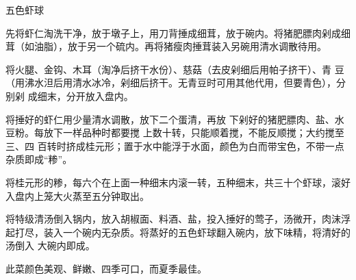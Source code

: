 \begin{recipe}{五色虾球}

\ingredients


\preparation

\step 先将虾仁淘洗干净，放于墩子上，用刀背捶成细茸，放于碗内。将猪肥膘肉剁成细
茸（如油脂），放于另一个硫内。再将猪瘦肉捶茸装入另碗用清水调散待用。

\step 将火腿、金钩、木耳（淘净后挤干水份）、慈菇（去皮剁细后用帕子挤干）、青
豆（用沸水泹后用清水冰冷，剁细后挤干。无青豆时可用其他代用，但要青色），分别剁
成细末，分开放入盘内。

\step 将捶好的虾仁用少量清水调散，放下二个蛋清，再放 下剁好的猪肥膘肉、盐、水
豆粉。每放下一样品种时都要搅 上数十转，只能顺着搅，不能反顺搅；大约搅至三、四
百转时挤成桂元形；置于水中能浮于水面，颜色为白而带宝色，不带一点杂质即成“糁”。

\step 将桂元形的糁，每六个在上面一种细末内滚一转，五种细末，共三十个虾球，滚好
入盘内上笼大火蒸至五分钟取出。

\step 将特级清汤倒入锅内，放入胡椒面、料酒、盐，投入捶好的莺子，汤微开，肉沫浮
起打尽，装入一个碗内无杂质。将蒸好的五色虾球翻入碗内，放下味精，将清好的汤倒入
大碗内即成。

\features

此菜颜色美观、鲜嫩、四季可口，而夏季最佳。

\end{recipe}

